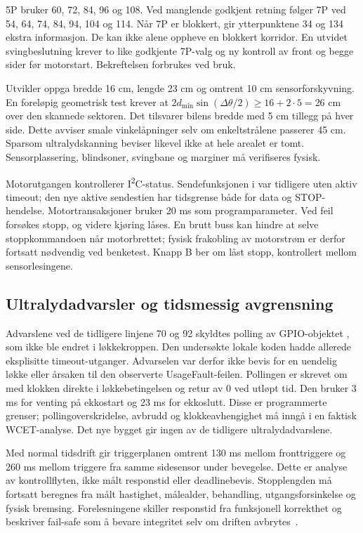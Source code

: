 5P bruker 60, 72, 84, 96 og 108\textdegree{}. Ved manglende godkjent
retning følger 7P ved 54, 64, 74, 84, 94, 104 og 114\textdegree{}.
Når 7P er blokkert, gir ytterpunktene 34 og 134\textdegree{} ekstra
informasjon. De kan ikke alene oppheve en blokkert korridor.
En utvidet svingbeslutning krever to like godkjente 7P-valg og ny kontroll
av front og begge sider før motorstart. Bekreftelsen forbrukes ved bruk.

Utvikler oppga bredde 16 cm, lengde 23 cm og omtrent 10 cm
sensorforskyvning. En foreløpig geometrisk test krever at
\(2d_{\min}\sin(\Delta\theta/2)\geq 16+2\cdot5=26\) cm over den
skannede sektoren. Det tilsvarer bilens bredde med 5 cm tillegg på hver side.
Dette avviser smale vinkelåpninger selv om enkeltstrålene passerer 45 cm.
Sparsom ultralydskanning beviser likevel ikke at hele arealet er tomt.
Sensorplassering, blindsoner, svingbane og marginer må verifiseres fysisk.

Motorutgangen kontrollerer I\textsuperscript{2}C-status. Sendefunksjonen
i  var tidligere uten aktiv timeout; den nye aktive
sendestien har tidsgrense både for data og STOP-hendelse. Motortransaksjoner
bruker 20 ms som programparameter. Ved feil forsøkes stopp, og videre
kjøring låses. En brutt buss kan hindre at selve stoppkommandoen når
motorbrettet; fysisk frakobling av motorstrøm er derfor fortsatt nødvendig
ved benketest. Knapp B ber om låst stopp, kontrollert mellom sensorlesingene.

\subsection{Ultralydadvarsler og tidsmessig avgrensning}
Advarslene ved de tidligere linjene 70 og 92 skyldtes polling av
GPIO-objektet , som ikke ble endret i løkkekroppen.
Den undersøkte lokale koden hadde allerede eksplisitte timeout-utganger.
Advarselen var derfor ikke bevis for en uendelig løkke eller årsaken til
den observerte UsageFault-feilen. Pollingen er skrevet om med klokken
direkte i løkkebetingelsen og retur av 0 ved utløpt tid. Den bruker
3 ms for venting på ekkostart og 23 ms for ekkoslutt. Disse er
programmerte grenser; pollingoverskridelse, avbrudd og klokkeavhengighet
må inngå i en faktisk WCET-analyse. Det nye bygget gir ingen av de tidligere
ultralydadvarslene.

Med normal tidsdrift gir triggerplanen omtrent 130 ms mellom fronttriggere
og 260 ms mellom triggere fra samme sidesensor under bevegelse. Dette er
analyse av kontrollflyten, ikke målt responstid eller deadlinebevis.
Stopplengden må fortsatt beregnes fra målt hastighet, målealder,
behandling, utgangsforsinkelse og fysisk bremsing. Forelesningene skiller
responstid fra funksjonell korrekthet og beskriver fail-safe som å bevare
integritet selv om driften avbrytes~\cite{forelesninger2026}.

